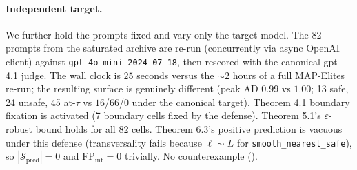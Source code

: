 \documentclass[11pt]{article}
\begin{document}
\begin{table}[h]
\centering
\small
\caption{Seed replication of the saturated pipeline on
\texttt{gpt-3.5-turbo-0125}. The second row is a second independent
run of the same configuration (no fixed RNG; LLM temperature $0.7$).
Surface quantities agree within $\sim 6\%$ and
$\mathrm{FP}_{\mathrm{int}} = 0$ holds in both runs.}
\label{tab:seed-replication}

\end{table}

\paragraph{Independent target.}
We further hold the prompts fixed and vary only the target model. The
82 prompts from the saturated archive are re-run (concurrently via
async OpenAI client) against \texttt{gpt-4o-mini-2024-07-18}, then
rescored with the canonical gpt-4.1 judge. The wall clock is $25$
seconds versus the $\sim 2$ hours of a full MAP-Elites re-run; the
resulting surface is genuinely different (peak AD $0.99$ vs $1.00$;
13 safe, 24 unsafe, 45 at-$\tau$ vs $16$/$66$/$0$ under the canonical
target). Theorem 4.1 boundary fixation is activated (7 boundary cells
fixed by the defense). Theorem 5.1's $\varepsilon$-robust bound holds
for all $82$ cells. Theorem 6.3's positive prediction is vacuous under
this defense (transversality fails because $\ell \sim L$ for
\texttt{smooth\_nearest\_safe}), so $|\mathcal{S}_{\mathrm{pred}}|=0$
and FP$_{\mathrm{int}}=0$ trivially. No counterexample
().

\begin{table}[h]
\centering
\small
\caption{Independent target. Same 82 prompts, judge held at gpt-4.1,
target swapped from gpt-3.5-turbo-0125 to gpt-4o-mini-2024-07-18.
Surface quantities drop roughly $2\times$ as expected for the
better-aligned target; $\mathrm{FP}_{\mathrm{int}} = 0$ holds in both
runs under the same continuous defense.}
\label{tab:independent-dataset}

\end{table}

\begin{table}[h]
\centering
\small
\caption{Bootstrap percentile CIs (median,
$[5^{\text{th}}, 95^{\text{th}}]$) over $B = 1000$ resamples of
the per-pair finite-difference populations underlying each
estimator on the saturated live run.}
\label{tab:ci}

\end{table}
\end{document}
